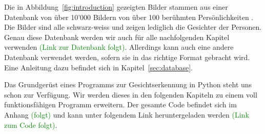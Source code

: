 Die in Abbildung~\ref{fig:introduction} gezeigten Bilder stammen aus einer Datenbank von über 10'000 Bildern von über 100 berühmten Persönlichkeiten \cite{Chen14}.
Die Bilder sind alle schwarz-weiss und zeigen lediglich die Gesichter der Personen.
Genau diese Datenbank werden wir auch für alle nachfolgenden Kapitel verwenden \textcolor{green}{(Link zur Datenbank folgt)}.
Allerdings kann auch eine andere Datenbank verwendet werden, sofern sie in das richtige Format gebracht wird.
Eine Anleitung dazu befindet sich in Kapitel~\ref{sec:database}.

Das Grundgerüst eines Programms zur Gesichtserkennung in Python steht uns schon zur Verfügung.
Wir werden dieses in den folgenden Kapiteln zu einem voll funktionsfähigen Programm erweitern.
Der gesamte Code befindet sich im Anhang \textcolor{green}{(folgt)} und kann unter folgendem Link heruntergeladen werden \textcolor{green}{(Link zum Code folgt)}.